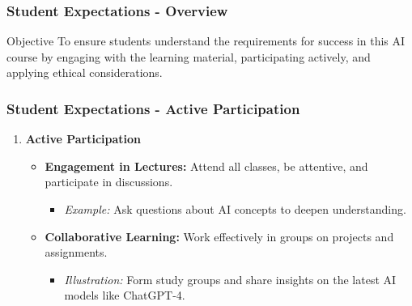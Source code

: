 \documentclass[aspectratio=169]{beamer}
\begin{document}
\begin{frame}[fragile]
    \frametitle{Student Expectations - Overview}
    \begin{block}{Objective}
        To ensure students understand the requirements for success in this AI course by engaging with the learning material, participating actively, and applying ethical considerations.
    \end{block}
\end{frame}

\begin{frame}[fragile]
    \frametitle{Student Expectations - Active Participation}
    \begin{enumerate}
        \item \textbf{Active Participation}
        \begin{itemize}
            \item \textbf{Engagement in Lectures:} Attend all classes, be attentive, and participate in discussions.
            \begin{itemize}
                \item \textit{Example:} Ask questions about AI concepts to deepen understanding.
            \end{itemize}
            \item \textbf{Collaborative Learning:} Work effectively in groups on projects and assignments.
            \begin{itemize}
                \item \textit{Illustration:} Form study groups and share insights on the latest AI models like ChatGPT-4.
            \end{itemize}
        \end{itemize}
    \end{enumerate}
\end{frame}
\end{document}
